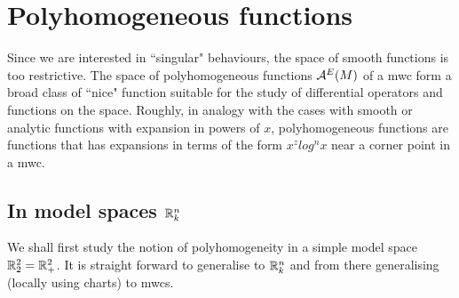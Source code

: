 \documentclass{article}
\title{}
\date{}
\begin{document}
\section{Polyhomogeneous functions}
Since we are interested in ``singular" behaviours, the space of smooth functions is too restrictive. The space of polyhomogeneous functions ${\cal A}^E(M)$ of a mwc form a broad class of ``nice" function suitable for the study of differential operators and functions on the space. Roughly, in analogy with the cases with smooth or analytic functions with expansion in powers of $x$, polyhomogeneous functions are functions that has expansions in terms of the form $x^z log^nx$  near a corner point in a mwc.  


\subsection{In model spaces ${\mathbb R}^n_k$}
We shall first study the notion of polyhomogeneity in a simple model space ${\mathbb R}^2_2 = {\mathbb R}^2_+$. It is straight forward to generalise to ${\mathbb R}^n_k$ and from there generalising (locally using charts) to mwcs. 
\end{document}
